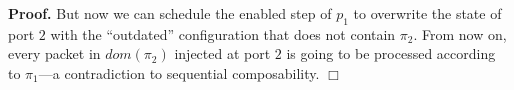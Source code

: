 \documentclass[11pt,pdftex,letter]{article}
\newcommand{\dom}{\textit{dom}}
\newenvironment{proof}[1][Proof]{\noindent\textbf{#1.} }{\hfill $\Box$\\[2mm]}
\begin{document}
\begin{appendix}
\begin{proof}
But now we can schedule the enabled step of $p_1$ to overwrite the
state of port $2$ with the ``outdated'' configuration that does not
contain $\pi_2$. From now on, every packet in $\dom(\pi_2)$ injected
at port $2$ is going to be processed according to $\pi_1$---a
contradiction to sequential composability.
\end{proof}

\end{appendix}
\end{document}
